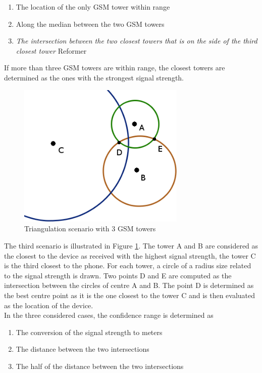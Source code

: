 \begin{enumerate}
\item The location of the only GSM tower within range
\item Along the median between the two GSM towers
\item \emph{The intersection between the two closest towers that is on the side of the third closest tower} Reformer
\end{enumerate}

If more than three GSM towers are within range, the closest towers are determined as the ones with the strongest signal strength.\\

\begin{figure}[h]
  \centering
  \includegraphics[width=8cm]{images/tower-schema.png}
  \caption{Triangulation scenario with 3 GSM towers}
  \label{fig:triangulation-scenario-3}
\end{figure}
The third scenario is illustrated in Figure \ref{fig:triangulation-scenario-3}.
The tower A and B are considered as the closest to the device as received with the highest signal strength, the tower C is the third closest to the phone.
For each tower, a circle of a radius size related to the signal strength is drawn.
Two points D and E are computed as the intersection between the circles of centre A and B.
The point D is determined as the best centre point as it is the one closest to the tower C and is then evaluated as the location of the device.\\

In the three considered cases, the confidence range is determined as
\begin{enumerate}
\item The conversion of the signal strength to meters
\item The distance between the two intersections
\item The half of the distance between the two intersections
\end{enumerate}

